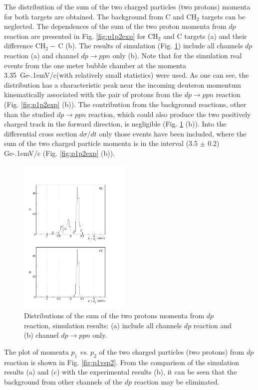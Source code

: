 \documentclass[twocolumn,epjc3]{svjour3}
\newcommand{\dpfrag} {\ensuremath{dp \rightarrow ppn}\xspace}
\newcommand{\GeVc}   {Ge\kern-.1emV/c\xspace}
\begin{document}
The distribution of the sum of the two charged particles (two protons) momenta
for both targets are obtained. The background from C and CH$_2$ targets can be
neglected. The dependences of the sum of the two proton momenta from $dp$
reaction are presented in Fig. \ref{fig:p1p2exp} for CH$_2$ and C targets (a)
and their difference CH$_2-\,$C (b). The results of simulation
(Fig. \ref{fig:p1p2sim}) include all channels $dp$ reaction (a) and channel
\dpfrag only (b). Note that for the simulation real events from the one meter
bubble chamber at the momenta 3.35~\GeVc (with relatively small statistics) were
used. As one can see, the distribution has a characteristic peak near the
incoming deuteron momentum kinematically associated with the pair of protons
from the \dpfrag reaction (Fig. \ref{fig:p1p2exp} (b)). The contribution from
the background reactions, other than the studied \dpfrag reaction, which could
also produce the two positively charged track in the forward direction, is
negligible (Fig. \ref{fig:p1p2sim} (b)). Into the differential cross section
$d\sigma/dt$ only those events have been included, where the sum of the two
charged particle momenta is in the interval (3.5 $\pm$ 0.2) \GeVc
(Fig. \ref{fig:p1p2exp} (b)).

\begin{figure}[h]
  \centering
  \includegraphics[width=0.48\textwidth]{p1_plus_p2_2.pdf}
  \caption{Distributions of the sum of the two protons momenta from $dp$
    reaction, simulation results: (a) include all channels $dp$ reaction and (b)
    channel \dpfrag only.}
  \label{fig:p1p2sim}
\end{figure}

The plot of momenta $p_1$ \textit{vs.} $p_2$ of the two charged particles (two
protons) from $dp$ reaction is shown in Fig. \ref{fig:p1vsp2}. From the
comparison of the simulation results (a) and (c) with the experimental results
(b), it can be seen that the background from other channels of the $dp$ reaction
may be eliminated.
\end{document}
